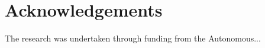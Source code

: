 \section{Acknowledgements}\label{sec:acknowledgements}
The research was undertaken through funding from the Autonomous...